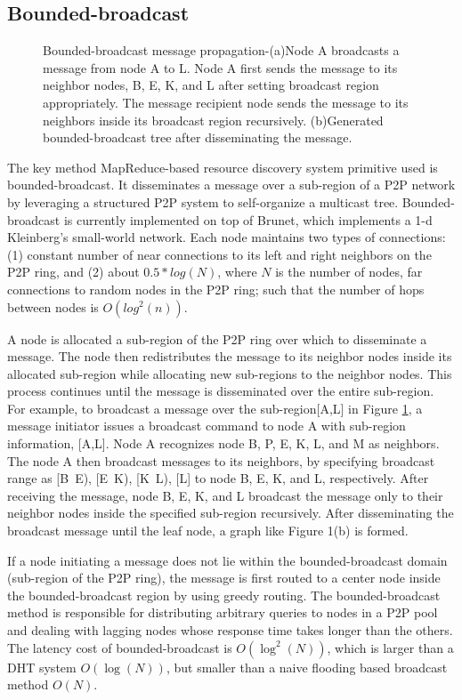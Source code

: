 \documentclass{acm_proc_article-sp}
\begin{document}
\subsection{Bounded-broadcast}
\begin{figure}[t]

\centering
{}
\caption{Bounded-broadcast message propagation-(a)Node A broadcasts a message from node A to L. Node A first sends the message to its neighbor nodes, B, E, K, and L after setting broadcast region appropriately.
The message recipient node sends the message to its neighbors inside its broadcast region recursively. (b)Generated bounded-broadcast tree after disseminating the message.
\label{figure:bb}
}
\end{figure}
The key method MapReduce-based resource discovery system primitive used is bounded-broadcast\cite{deetoo}. It disseminates a message over a sub-region of a P2P network by leveraging a structured P2P system to self-organize a multicast tree. 
Bounded-broadcast is currently implemented on top of Brunet\cite{brunet}, which implements a 1-d Kleinberg's small-world network\cite{small_world_network}.
Each node maintains two types of connections: (1) constant number of near connections to its left and right neighbors on the P2P ring, and (2) about $0.5*log(N)$, where $N$ is the number of nodes, far connections to random nodes in the P2P ring; such that the number of hops between nodes is $O(log^2(n))$.

A node is allocated a sub-region of the P2P ring over which to disseminate a message. The node then redistributes the message to its neighbor nodes inside its allocated sub-region while allocating new sub-regions to the neighbor nodes. This process continues until the message is disseminated over the entire sub-region. 
For example, to broadcast a message over the sub-region[A,L] in Figure \ref{figure:bb}, a message initiator issues a broadcast command to node A with sub-region information, [A,L]. 
Node A recognizes node B, P, E, K, L, and M as neighbors.
The node A then broadcast messages to its neighbors, by specifying broadcast range as [B~E), [E~K), [K~L), [L] to node B, E, K, and L, respectively.
After receiving the message, node B, E, K, and L broadcast the message only to their neighbor nodes inside the specified sub-region recursively. 
After disseminating the broadcast message until the leaf node, a graph like Figure 1(b) is formed.

If a node initiating a message does not lie within the bounded-broadcast domain (sub-region of the P2P ring), the message is first routed to a center node inside the bounded-broadcast region by using greedy routing.
The bounded-broadcast method is responsible for distributing arbitrary queries to nodes in a P2P pool and dealing with lagging nodes whose response time takes longer than the others. 
The latency cost of bounded-broadcast is $O(\log^2(N))$\cite{deetoo}, which is larger than a DHT system $O(\log(N))$\cite{chord}, but smaller than a naive flooding based broadcast method $O(N)$.
\end{document}
